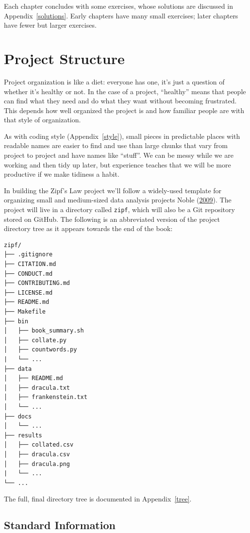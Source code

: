 \documentclass[
]{krantz}
\begin{document}
Each chapter concludes with some exercises,
whose solutions are discussed in Appendix~\ref{solutions}.
Early chapters have many small exercises;
later chapters have fewer but larger exercises.

\hypertarget{intro-structure}{%
\section{Project Structure}\label{intro-structure}}

Project organization is like a diet:
everyone has one,
it's just a question of whether it's healthy or not.
In the case of a project,
``healthy'' means that people can find what they need and do what they want without becoming frustrated.
This depends how well organized the project is
and how familiar people are with that style of organization.

As with coding style (Appendix~\ref{style}),
small pieces in predictable places with readable names are easier to find and use
than large chunks that vary from project to project and have names like ``stuff''.
We can be messy while we are working and then tidy up later,
but experience teaches that we will be more productive if we make tidiness a habit.

In building the Zipf's Law project we'll follow
a widely-used template
for organizing small and medium-sized data analysis projects Noble (\protect\hyperlink{ref-Nobl2009}{2009}).
The project will live in a directory called \texttt{zipf},
which will also be a Git repository stored on GitHub.
The following is an abbreviated version of the project directory tree
as it appears towards the end of the book:

\begin{verbatim}
zipf/
├── .gitignore
├── CITATION.md
├── CONDUCT.md
├── CONTRIBUTING.md   
├── LICENSE.md   
├── README.md
├── Makefile   
├── bin   
│   ├── book_summary.sh   
│   ├── collate.py   
│   ├── countwords.py   
|   └── ...    
├── data
│   ├── README.md   
│   ├── dracula.txt  
│   ├── frankenstein.txt  
│   └── ...   
├── docs
│   └── ...
├── results
│   ├── collated.csv
│   ├── dracula.csv
│   ├── dracula.png
|   └── ...
└── ...
\end{verbatim}

The full, final directory tree is documented in Appendix~\ref{tree}.

\hypertarget{intro-boilerplate}{%
\subsection{Standard Information}\label{intro-boilerplate}}
\end{document}
